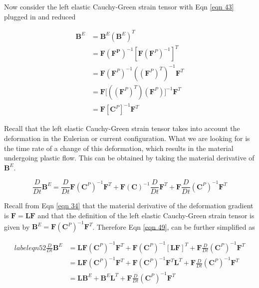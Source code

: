 \documentclass[a4paper]{article}
\begin{document}
Now consider the left elastic Cauchy-Green strain tensor with Eqn \ref{eqn 43} plugged in and reduced

\begin{align}
    \mathbf{B}^E 
    &= \mathbf{B}^E (\mathbf{B}^E)^T \\
    &= \mathbf{F} (\mathbf{F^P})^{-1} [\mathbf{F} (\mathbf{F}^P)^{-1}]^T \\
    &= \mathbf{F} (\mathbf{F}^P)^{-1} ((\mathbf{F}^P)^T)^{-1} \mathbf{F}^T\\
    &= \mathbf{F} \biggl[((\mathbf{F}^P)^T) (\mathbf{F}^P) \biggr]^{-1} \mathbf{F}^T \\ 
    &= \mathbf{F} [\mathbf{C}^P]^{-1} \mathbf{F}^T
\end{align}

Recall that the left elastic Cauchy-Green strain tensor takes into account the deformation in the Eulerian or current configuration. What we are looking for is the time rate of a change of this deformation, which results in the material undergoing plastic flow. This can be obtained by taking the material derivative of $\mathbf{B}^E$. 

\begin{equation}\label{eqn 49}
    \frac{D}{Dt}\mathbf{B}^E = \frac{D}{Dt}\mathbf{F} (\mathbf{C}^P)^{-1} \mathbf{F}^T + \mathbf{F}(\mathbf{C})^{-1} \frac{D}{Dt} \mathbf{F}^T + \mathbf{F} \frac{D}{Dt}(\mathbf{C}^P)^{-1} \mathbf{F}^T
\end{equation}

Recall from Eqn \ref{eqn 34} that the material derivative of the deformation gradient is $\mathbf{F} = \mathbf{L} \mathbf{F}$ and that the definition of the left elastic Cauchy-Green strain tensor is given by $\mathbf{B}^E = \mathbf{F} (\mathbf{C}^P)^{-1} \mathbf{F}^T$. Therefore Eqn \ref{eqn 49}, can be further simplified as 

\begin{align}label{eqn 52}
    \frac{D}{Dt}\mathbf{B}^E 
    &= \mathbf{L} \mathbf{F} (\mathbf{C}^P)^{-1} \mathbf{F}^T + \mathbf{F} (\mathbf{C}^P)^{-1} [\mathbf{L} \mathbf{F}]^T + \mathbf{F} \frac{D}{Dt}(\mathbf{C}^P)^{-1} \mathbf{F}^T \\
    &= \mathbf{L} \mathbf{F} (\mathbf{C}^P)^{-1} \mathbf{F}^T + \mathbf{F} (\mathbf{C}^P)^{-1} \mathbf{F}^T \mathbf{L}^T + \mathbf{F} \frac{D}{Dt}(\mathbf{C}^P)^{-1} \mathbf{F}^T \\
    &= \mathbf{L}\mathbf{B}^E + \mathbf{B}^E \mathbf{L}^T + \mathbf{F} \frac{D}{Dt}(\mathbf{C}^P)^{-1} \mathbf{F}^T
\end{align}
\end{document}
